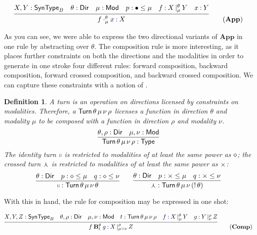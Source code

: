 \documentclass{amsart}
\newtheorem{definition}[theorem]{Definition}
\begin{document}
\begin{equation}
  \infer{f \cdot^\theta_\mu x \syn:X}
  {
    X, Y : \ty{SynType}_B &
    \theta : \ty{Dir} &
    \mu : \ty{Mod} &
    p : \con\bullet\leq\mu &
    f \syn: \arrty X|[\theta,\mu] Y &
    x \syn: Y
  }\tag{$\mathbf{App}$}
\end{equation}

As you can see, we were able to express the two directional variants of
$\mathbf{App}$ in one rule by abstracting over $\theta$. The composition
rule is more interesting, as it places further constraints on both the
directions and the modalities in order to generate in one stroke four
different rules: forward composition, backward composition, forward crossed
composition, and backward crossed composition. We can capture these
constraints with a notion of .

\begin{definition}
  A \emph{turn} is an operation on directions licensed by
  constraints on modalities. Therefore, a $\mathsf{Turn}\,
  \theta\,\mu\,\nu\,\rho$ licenses a function in direction $\theta$
  and modality $\mu$ to be composed with a function in direction
  $\rho$ and modality $\nu$.
  \[
    \infer{\ty{Turn}\,\theta\,\mu\,\nu\,\rho : \ty{Type}}
    {
      \theta,\rho : \ty{Dir} &
      \mu, \nu: \ty {Mod}
    }
  \]
  The identity turn $\mathsf{\shortparallel}$ is restricted to modalities
  of at least the same power as $\mathsf{\diamond}$; the crossed turn
  $\mathsf{\curlywedge}$ is restricted to modalities of at least the same
  power as $\mathsf{\times}$:
  \[
    \infer{\con\shortparallel : \ty{Turn}\,\theta\,\mu\,\nu\,\theta}
    {
      \theta : \ty{Dir} &
      p : \con\diamond\leq\mu &
      q : \con\diamond\leq\nu
    }
    \qquad
    \infer{\con\curlywedge : \ty{Turn}\,\theta\,\mu\,\nu\,(!\,\theta)}
    {
      \theta : \ty{Dir} &
      p : \con\times\leq\mu &
      q : \con\times\leq\nu
    }
  \]
\end{definition}

With this in hand, the rule for composition may be expressed in one
shot:

\begin{equation}
  \infer{f \mathbin{\bf B}_t^\theta g \syn: \arrty X|[\rho,\mu\lor\nu]Z}
  {
    X, Y, Z : \ty{SynType}_B &
    \theta,\rho : \ty{Dir} &
    \mu,\nu : \ty{Mod} &
    t : \ty{Turn}\,\theta\,\mu\,\nu\,\rho &
    f \syn: \arrty X|[\theta,\mu] Y &
    g \syn: \arrty Y|[\rho,\nu] Z
  }\tag{$\mathbf{Comp}$}
\end{equation}
\end{document}
